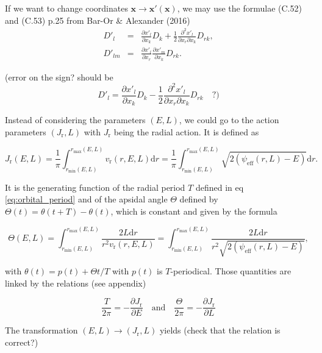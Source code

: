 \documentclass[11pt]{article}
\newcommand{\rr}{\mathrm{r}}
\newcommand{\rd}{{\mathrm{d}}}
\newcommand{\psieff}{\psi_{\mathrm{eff}}}
\newcommand{\vr}{v_{\rr}}
\newcommand{\Jr}{J_{\rr}}
\newcommand{\rmax}{r_{\max}}
\newcommand{\rmin}{r_{\min}}
\newcommand{\xp}{x'}
\newcommand{\bx}{\boldsymbol{x}}
\newcommand{\bxp}{\boldsymbol{\xp}}
\begin{document}
If we want to change coordinates $\bx\rightarrow\bxp(\bx)$,
we may use the formulae (C.52) and (C.53) p.25 from Bar-Or \& Alexander
(2016)
\begin{equation}
\begin{array}{ccl}
  D'_{l} & =& \displaystyle{\frac{\partial \xp_{l}}{\partial x_{k}}D_{k}+\frac{1}{2}\frac{\partial^{2}\xp_{l}}{\partial x_{r}\partial x_{k}}D_{rk}} ,\\
  
 D'_{lm} & =&\displaystyle{\frac{\partial \xp_{l}}{\partial x_{r}}\frac{\partial \xp_{m}}{\partial x_{k}}D_{rk}} .
\end{array}
\label{eq:change_var_DiffCoeffs}
\end{equation}


(error on the sign? should be
\[
D'_{l}=\frac{\partial \xp_{l}}{\partial x_{k}}D_{k}-\frac{1}{2}\frac{\partial^{2}\xp_{l}}{\partial x_{r}\partial x_{k}}D_{rk}\quad?)
\]

Instead of considering the parameters $(E,L)$, we could go to the action parameters $(\Jr,L)$ with $\Jr$ being the radial action. It is defined as

\begin{equation}
  \Jr(E,L) = \frac{1}{\pi} \int_{\rmin(E,L)}^{\rmax(E,L)}\vr(r,E,L)\rd r =  \frac{1}{\pi} \int_{\rmin(E,L)}^{\rmax(E,L)} \sqrt{2(\psieff(r,L)-E)}\rd r.
  \label{eq:Radial_action}
  \end{equation}

It is the generating function of the radial period $T$ defined in eq \eqref{eq:orbital_period} and of the apsidal angle $\Theta$ defined by  $\Theta(t)=\theta(t+T)-\theta(t)$, which is constant and given by the formula

\begin{equation}
  \Theta(E,L)=   \int_{\rmin(E,L)}^{\rmax(E,L)} \frac{2 L \rd r}{r^{2}\vr(r,E,L)} =   \int_{\rmin(E,L)}^{\rmax(E,L)} \frac{2 L \rd r}{r^{2}\sqrt{2(\psieff(r,L)-E)}}, 
  \label{eq:Apsidal_angle}
\end{equation}

with $\theta(t) = p(t) + \Theta t/T$ with $p(t)$ is $T$-periodical.
Those quantities are linked by the relations  (see appendix)

\begin{equation}
  \frac{T}{2\pi} = -\frac{\partial \Jr}{\partial E}\quad \mathrm{and} \quad
  \frac{\Theta}{2\pi} = -\frac{\partial \Jr}{\partial L}
  \label{eq:dJr}
\end{equation}

The transformation $(E,L) \rightarrow (\Jr,L)$ yields (check that the relation is correct?)
\end{document}

